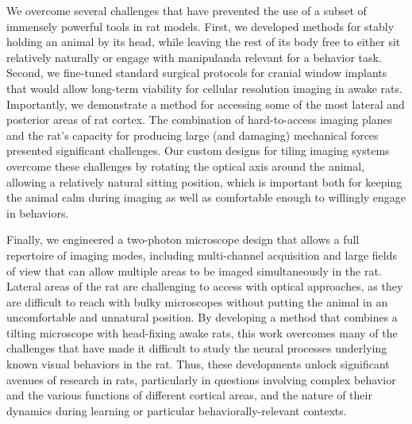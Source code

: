 We overcome several challenges that have prevented the use of a subset of immensely powerful tools in rat models. First, we developed methods for stably holding an animal by its head, while leaving the rest of its body free to either sit relatively naturally or engage with manipulanda relevant for a behavior task. Second, we fine-tuned standard surgical protocols for cranial window implants that would allow long-term viability for cellular resolution imaging in awake rats. Importantly, we demonstrate a method for accessing some of the most lateral and posterior areas of rat cortex. The combination of hard-to-access imaging planes and the rat's capacity for producing large (and damaging) mechanical forces presented significant challenges. Our custom designs for tiling imaging systems overcome these challenges by rotating the optical axis around the animal, allowing a relatively natural sitting position, which is important both for keeping the animal calm during imaging as well as comfortable enough to willingly engage in behaviors. 

Finally, we engineered a two-photon microscope design that allows a full repertoire of imaging modes, including multi-channel acquisition and large fields of view that can allow multiple areas to be imaged simultaneously in the rat. Lateral areas of the rat are challenging to access with optical approaches, as they are difficult to reach with bulky microscopes without putting the animal in an uncomfortable and unnatural position. By developing a method that combines a tilting microscope with head-fixing awake rats, this work overcomes many of the challenges that have made it difficult to study the neural processes underlying known visual behaviors in the rat. Thus, these developments unlock significant avenues of research in rats, particularly in questions involving complex behavior and the various functions of different cortical areas, and the nature of their dynamics during learning or particular behaviorally-relevant contexts. 





